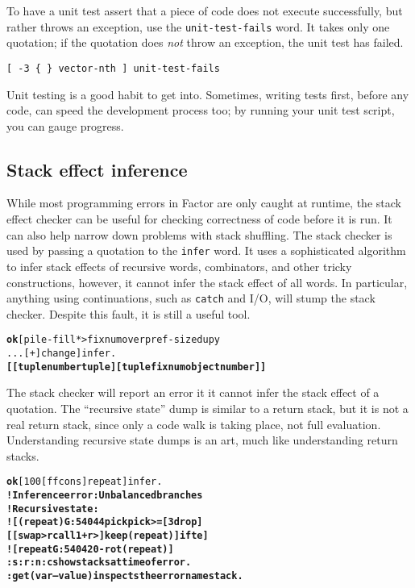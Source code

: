 \documentclass{book}
\begin{document}
To have a unit test assert that a piece of code does not execute successfully, but rather throws an exception, use the \texttt{unit-test-fails} word. It takes only one quotation; if the quotation does \emph{not} throw an exception, the unit test has failed.

\begin{verbatim}
[ -3 { } vector-nth ] unit-test-fails
\end{verbatim}

Unit testing is a good habit to get into. Sometimes, writing tests first, before any code, can speed the development process too; by running your unit test script, you can gauge progress.

\subsection{Stack effect inference}

While most programming errors in Factor are only caught at runtime, the stack effect checker can be useful for checking correctness of code before it is run. It can also help narrow down problems with stack shuffling. The stack checker is used by passing a quotation to the \texttt{infer} word. It uses a sophisticated algorithm to infer stack effects of recursive words, combinators, and other tricky constructions, however, it cannot infer the stack effect of all words. In particular, anything using continuations, such as \texttt{catch} and I/O, will stump the stack checker. Despite this fault, it is still a useful tool.

\begin{alltt}
\textbf{ok} [ pile-fill * >fixnum over pref-size dup y
\texttt{...} [ + ] change ] infer .
\textbf{[ [ tuple number tuple ] [ tuple fixnum object number ] ]}
\end{alltt}

The stack checker will report an error it it cannot infer the stack effect of a quotation. The ``recursive state'' dump is similar to a return stack, but it is not a real return stack, since only a code walk is taking place, not full evaluation. Understanding recursive state dumps is an art, much like understanding return stacks.

\begin{alltt}
\textbf{ok} [ 100 [ f f cons ] repeat ] infer .
\textbf{! Inference error: Unbalanced branches
! Recursive state:
! [ (repeat) G:54044 pick pick >= [ 3drop ]
    [ [ swap >r call 1 + r> ] keep (repeat) ] ifte ]
! [ repeat G:54042 0 -rot (repeat) ]
:s :r :n :c show stacks at time of error.
:get ( var -- value ) inspects the error namestack.}
\end{alltt}
\end{document}
